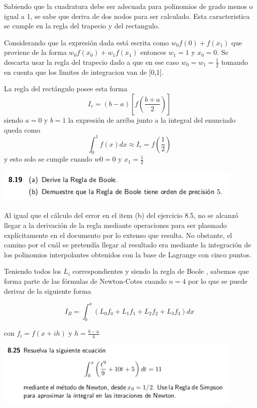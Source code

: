 \documentclass[11pt]{article}
\begin{document}
Sabiendo que la cuadratura debe ser adecuada para polinomios de grado menos o igual a 1, se sabe que deriva de dos nodos para ser calculado. Esta caracteristica se cumple en la regla del trapecio y del rectangulo.

Considerando que la expresión dada está escrita como $w_0f(0)+f(x_1)$ que proviene de la forma $w_0f(x_0)+w_1f(x_1)$ entonces $w_1=1$ y $x_0=0$. Se descarta usar la regla del trapecio dado a que en ese caso $w_0 = w_1 = \frac{1}{2}$ tomando en cuenta que los lìmites de integracion van de [0,1]. 

La regla del rectángulo posee esta forma 
\begin{equation}
I_r = (b-a)[f(\frac{b+a}{2})]
\end{equation}
siendo $a=0$ y $b=1$ la expresión de arriba junto a la integral del enunciado queda como
$$ \int_{0}^{1} f(x)dx \approx I_r = f(\frac{1}{2})$$
y esto solo se cumple cuando $w0 = 0$ y $x_1 = \frac{1}{2}$ 

\vspace{0.5cm}
\begin{center}
    \includegraphics[keepaspectratio, width=12cm]{8.19.png}
    \caption{\\}
\end{center} 

Al igual que el cálculo del error en el item (b) del ejercicio 8.5, no se alcanzó llegar a la derivación de la regla mediante operaciones para ser plasmado explícitamente en el documento por lo extenso que resulta. No obstante, el camino por el cuál se pretendía llegar al resultado era mediante la integración de los polinomios interpolantes obtenidos con la base de Lagrange con cinco puntos. 

Teniendo todos los $L_i$ correspondientes y siendo la regla de Boole , sabemos que forma parte de las fórmulas de Newton-Cotes cuando $n=4$ por lo que se puede derivar de la siguiente forma

$$I_B = \int_b^a (L_0 f_0 + L_1 f_1 + L_2 f_2 + L_3 f_3)dx $$

con $f_i = f(x + ih)$ y $h= \frac{b-a}{4}$
\begin{center}
    \includegraphics[keepaspectratio, width=12cm]{8.25.png}
    \caption{\\}
\end{center} 
\end{document}
